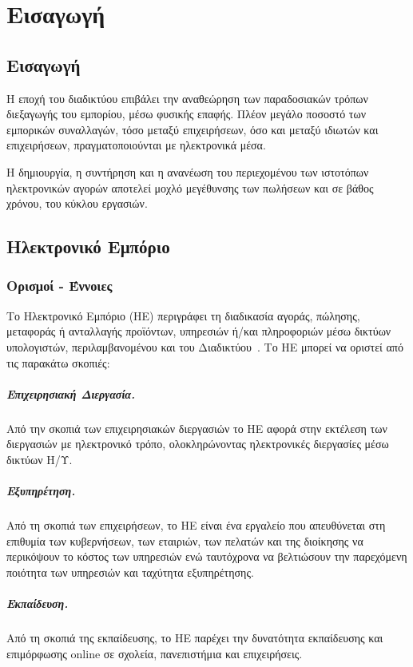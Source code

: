 \documentclass[12pt]{report}
\begin{document}
\hypersetup{pageanchor=true}
\clearpage
{}

\chapter{Εισαγωγή}\label{ch1}
\section{Εισαγωγή}
Η εποχή του διαδικτύου επιβάλει την αναθεώρηση των παραδοσιακών τρόπων διεξαγωγής του εμπορίου, μέσω φυσικής επαφής. Πλέον μεγάλο ποσοστό των εμπορικών συναλλαγών, τόσο μεταξύ επιχειρήσεων, όσο και μεταξύ ιδιωτών και επιχειρήσεων, πραγματοποιούνται με ηλεκτρονικά μέσα.

Η δημιουργία, η συντήρηση και η ανανέωση του περιεχομένου των ιστοτόπων ηλεκτρονικών αγορών αποτελεί μοχλό μεγέθυνσης των πωλήσεων και σε βάθος χρόνου, του κύκλου εργασιών.

\section{Ηλεκτρονικό Εμπόριο}
\subsection{Ορισμοί - Έννοιες}
Το Ηλεκτρονικό Εμπόριο (ΗΕ) περιγράφει τη διαδικασία αγοράς, πώλησης, μεταφοράς ή ανταλλαγής προϊόντων, υπηρεσιών ή/και πληροφοριών μέσω δικτύων υπολογιστών, περιλαμβανομένου και του Διαδικτύου~\cite{turban_outland_king_lee_liang_turban_2018}. Το ΗΕ μπορεί να οριστεί από τις παρακάτω σκοπιές:
  \paragraph{Επιχειρησιακή Διεργασία.} Από την σκοπιά των επιχειρησιακών διεργασιών το ΗΕ αφορά στην εκτέλεση των διεργασιών με ηλεκτρονικό τρόπο, ολοκληρώνοντας ηλεκτρονικές διεργασίες μέσω δικτύων Η/Υ.
  \paragraph{Εξυπηρέτηση.} Από τη σκοπιά των επιχειρήσεων, το ΗΕ είναι ένα εργαλείο που απευθύνεται στη επιθυμία των κυβερνήσεων, των εταιριών, των πελατών και της διοίκησης να περικόψουν το κόστος των υπηρεσιών ενώ ταυτόχρονα να βελτιώσουν την παρεχόμενη ποιότητα των υπηρεσιών και ταχύτητα εξυπηρέτησης.
  \paragraph{Εκπαίδευση.} Από τη σκοπιά της εκπαίδευσης, το ΗΕ παρέχει την δυνατότητα εκπαίδευσης και επιμόρφωσης \textlatin{online} σε σχολεία, πανεπιστήμια και επιχειρήσεις.
\end{document}
